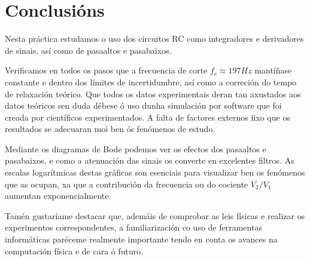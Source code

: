 \documentclass[12pt, a4paper, titlepage]{article}
\begin{document}
  \part{Conclusións}

  Nesta práctica estudamos o uso dos circuitos RC como integradores e derivadores de sinais, así como de pasaaltos e pasabaixos.

  Verificamos en todos os pasos que a frecuencia de corte $f_c \approx 197 Hz$ mantíñase constante e dentro dos límites de incertidumbre, así como a correción do tempo de relaxación teórico.
  Que todos os datos experimentais deran tan axustados aos datos teóricos sen duda débese ó uso dunha simulación por software que foi creada por científicos experimentados. A falta de factores externos fixo que os resultados se adecuaran moi ben ós fenómenos de estudo.

  Mediante os diagramas de Bode podemos ver os efectos dos pasaaltos e pasabaixos, e como a atenuación das sinais os converte en excelentes filtros.
  As escalas logarítmicas destas gráficas son esenciais para visualizar ben os fenómenos que as ocupan, xa que a contribución da frecuencia ou do cociente $V_2 / V_1$ aumentan exponencialmente.

  Tamén gustaríame destacar que, ademáis de comprobar as leis físicas e realizar os experimentos correspondentes, a familiarización co uso de ferramentas informáticas paréceme realmente importante tendo en conta os avances na computación física e de cara ó futuro.
\end{document}
